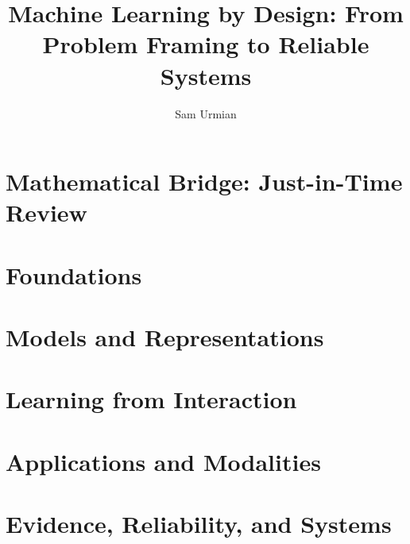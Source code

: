 \documentclass[10pt,twoside,openright]{book}
\title{Machine Learning by Design: From Problem Framing to Reliable Systems}
\author{Sam Urmian}
\date{}
\theoremstyle{plain}
\theoremstyle{definition}
\begin{document}
\hypersetup{pageanchor=false}



\frontmatter

\cleardoublepage
\hypersetup{pageanchor=true}


\tableofcontents
\clearpage
{\pagestyle{empty}\cleardoublepage}

\mainmatter
\part*{Mathematical Bridge: Just-in-Time Review}


\part{Foundations}







\part{Models and Representations}





\part{Learning from Interaction}


\part{Applications and Modalities}






\part{Evidence, Reliability, and Systems}





\appendix


\backmatter



\end{document}
